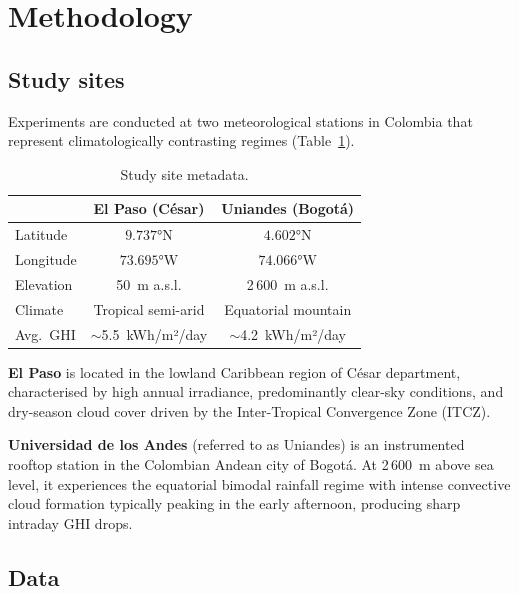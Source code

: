 \section{Methodology}
\label{sec:methodology}

\subsection{Study sites}

Experiments are conducted at two meteorological stations in Colombia that represent
climatologically contrasting regimes (Table~\ref{tab:sites}).

\begin{table}[t]
  \centering
  \caption{Study site metadata.}
  \label{tab:sites}
  \begin{tabular}{lcc}
    \toprule
    & \textbf{El Paso (César)} & \textbf{Uniandes (Bogotá)} \\
    \midrule
    Latitude  & $9.737°\text{N}$ & $4.602°\text{N}$ \\
    Longitude & $73.695°\text{W}$ & $74.066°\text{W}$ \\
    Elevation & 50~m a.s.l.      & 2\,600~m a.s.l.  \\
    Climate   & Tropical semi-arid & Equatorial mountain \\
    Avg.\ GHI & ${\sim}$5.5~kWh/m²/day & ${\sim}$4.2~kWh/m²/day \\
    \bottomrule
  \end{tabular}
\end{table}

\textbf{El Paso} is located in the lowland Caribbean region of C{\'e}sar department,
characterised by high annual irradiance, predominantly clear-sky conditions, and
dry-season cloud cover driven by the Inter-Tropical Convergence Zone (ITCZ).

\textbf{Universidad de los Andes} (referred to as Uniandes) is an instrumented
rooftop station in the Colombian Andean city of Bogot{\'a}. At 2\,600~m above sea
level, it experiences the equatorial bimodal rainfall regime with intense convective
cloud formation typically peaking in the early afternoon, producing sharp intraday
GHI drops.

\subsection{Data}

